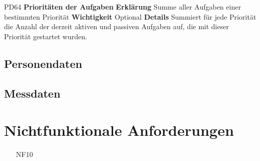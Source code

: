 \documentclass[a4paper,12pt]{article}
\begin{document}
\begin{itemize}[nosep]
\begin{minipage}[t]{\linewidth}
\item[PD64] \textbf{Prioritäten der Aufgaben}
\subitem \textbf{Erklärung} Summe aller Aufgaben einer bestimmten Priorität
\subitem \textbf{Wichtigkeit} Optional
\subitem \textbf{Details} Summiert für jede Priorität die Anzahl der derzeit aktiven und passiven Aufgaben auf, die mit dieser Priorität gestartet wurden.
\end{minipage}
\pagebreak

\end{itemize}

\subsection{Personendaten}
\subsection{Messdaten}

\section{Nichtfunktionale Anforderungen}
\begin{itemize}[nosep]
\leftskip=0.5cm
\item[NF10]
\end{itemize}










\end{document}

